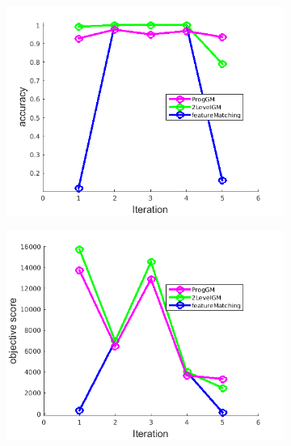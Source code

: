 \documentclass[
	fontsize=12pt,
	paper=a4,
	twoside=false,
	numbers=noenddot,
	plainheadsepline,
	toc=listof,
	toc=bibliography
]{scrartcl}
\begin{document}
\begin{figure}[h] 
	\begin{subfigure}[b]{0.3\textwidth}
		\centering
		\includegraphics[scale=0.25]{"fig_ver2608/RealImages/Img_trafo/no_descr/using_cdf_afftrafo/accuracy"}  
	\end{subfigure}%
	\begin{subfigure}[b]{0.3\textwidth}
		\centering
		\includegraphics[scale=0.25]{"fig_ver2608/RealImages/Img_trafo/no_descr/using_cdf_afftrafo/score"}  
	\end{subfigure} 
	\begin{subfigure}[b]{0.3\textwidth}
		\centering

\end{subfigure}
\end{figure}
\end{document}
